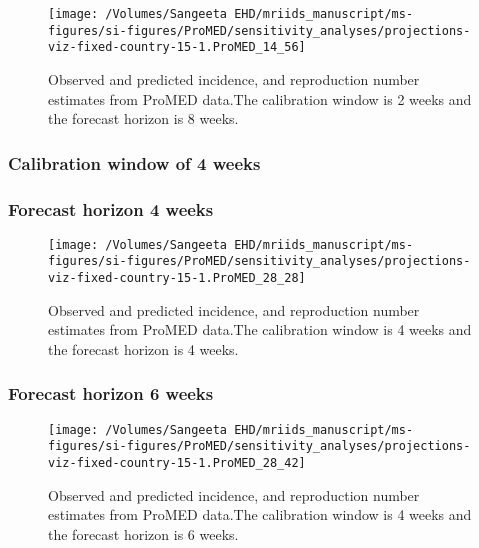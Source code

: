 \documentclass[11pt,]{article}
\begin{document}
\begin{figure}

  {\centering \texttt{[image: /Volumes/Sangeeta EHD/mriids\_manuscript/ms-figures/si-figures/ProMED/sensitivity\_analyses/projections-viz-fixed-country-15-1.ProMED\_14\_56]} 

  }

  \caption{Observed and predicted incidence, and reproduction number estimates from ProMED data.The calibration window is 2 weeks and the forecast horizon is 8 weeks.}\label{fig:SI-36}
\end{figure}

\hypertarget{calibration-window-of-4-weeks-3}{%
  \subsubsection{Calibration window of 4 weeks}\label{calibration-window-of-4-weeks-3}}

\hypertarget{forecast-horizon-4-weeks-9}{%
  \subsubsection{Forecast horizon 4 weeks}\label{forecast-horizon-4-weeks-9}}

\begin{figure}

  {
    \centering \texttt{[image: /Volumes/Sangeeta EHD/mriids\_manuscript/ms-figures/si-figures/ProMED/sensitivity\_analyses/projections-viz-fixed-country-15-1.ProMED\_28\_28]} 

  }

  \caption{Observed and predicted incidence, and reproduction number
    estimates from ProMED data.The calibration window is 4 weeks and
    the forecast horizon is 4 weeks.}
  \label{fig:pm44gamma}
\end{figure}

\hypertarget{forecast-horizon-6-weeks-10}{%
  \subsubsection{Forecast horizon 6 weeks}\label{forecast-horizon-6-weeks-10}}

\begin{figure}

  {\centering \texttt{[image: /Volumes/Sangeeta EHD/mriids\_manuscript/ms-figures/si-figures/ProMED/sensitivity\_analyses/projections-viz-fixed-country-15-1.ProMED\_28\_42]} 

  }

  \caption{Observed and predicted incidence, and reproduction number
    estimates from ProMED data.The calibration window is 4 weeks and
    the forecast horizon is 6 weeks.}
  \label{fig:pm46gamma}
\end{figure}
\end{document}
